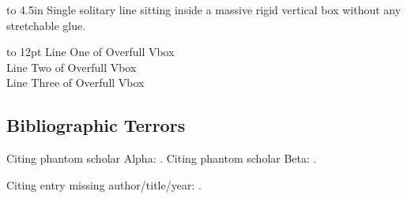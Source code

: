 \documentclass[11pt,unused_horror_option_flag]{article}
\begin{document}
\vbox to 4.5in{
  Single solitary line sitting inside a massive rigid vertical box without any stretchable glue.
}

\vbox to 12pt{
  {\Huge Line One of Overfull Vbox}\\
  {\Huge Line Two of Overfull Vbox}\\
  {\Huge Line Three of Overfull Vbox}
}

\subsection{Bibliographic Terrors}

Citing phantom scholar Alpha: \cite{phantom_author_alpha_2026}.
Citing phantom scholar Beta: \cite{phantom_author_beta_1999}.

Citing entry missing author/title/year: \cite{bad_entry_1,bad_entry_2}.



\end{document}
